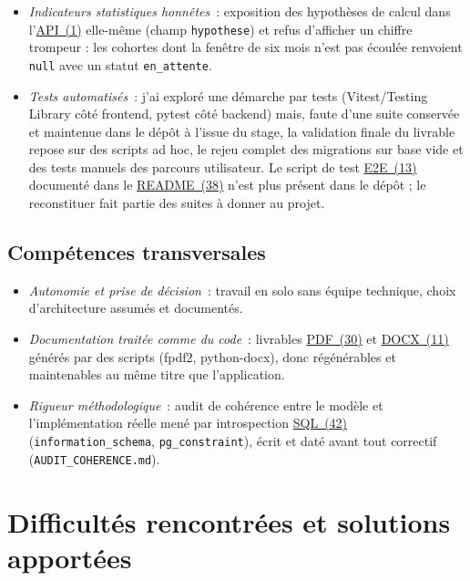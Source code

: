 \documentclass[12pt,a4paper]{report}
\begin{document}
\begin{itemize}
  \item \textit{Indicateurs statistiques honnêtes}~: exposition des hypothèses de calcul dans l'\hyperlink{abbr-API}{API~(1)} elle-même (champ \texttt{hypothese}) et refus d'afficher un chiffre trompeur : les cohortes dont la fenêtre de six mois n'est pas écoulée renvoient \texttt{null} avec un statut \texttt{en\_attente}.

  \item \textit{Tests automatisés}~: j'ai exploré une démarche par tests (Vitest/Testing Library côté frontend, pytest côté backend) mais, faute d'une suite conservée et maintenue dans le dépôt à l'issue du stage, la validation finale du livrable repose sur des scripts ad hoc, le rejeu complet des migrations sur base vide et des tests manuels des parcours utilisateur. Le script de test \hyperlink{abbr-E2E}{E2E~(13)} documenté dans le \hyperlink{abbr-README}{README~(38)} n'est plus présent dans le dépôt ; le reconstituer fait partie des suites à donner au projet.
\end{itemize}

\subsection{Compétences transversales}

\begin{itemize}
  \item \textit{Autonomie et prise de décision}~: travail en solo sans équipe technique, choix d'architecture assumés et documentés.

  \item \textit{Documentation traitée comme du code}~: livrables \hyperlink{abbr-PDF}{PDF~(30)} et \hyperlink{abbr-DOCX}{DOCX~(11)} générés par des scripts (fpdf2, python-docx), donc régénérables et maintenables au même titre que l'application.

  \item \textit{Rigueur méthodologique}~: audit de cohérence entre le modèle et l'implémentation réelle mené par introspection \hyperlink{abbr-SQL}{SQL~(42)} (\texttt{information\_schema}, \texttt{pg\_constraint}), écrit et daté avant tout correctif (\texttt{AUDIT\_COHERENCE.md}).
\end{itemize}

\section{Difficultés rencontrées et solutions apportées}
\end{document}
